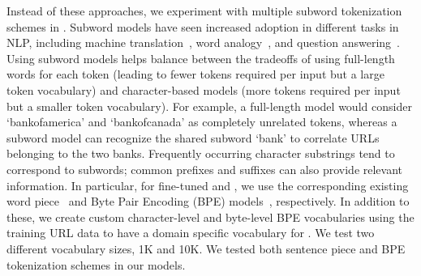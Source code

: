 Instead of these approaches, we experiment with multiple subword tokenization schemes in \URLTranSys.
Subword models have seen increased adoption in different tasks in NLP, including machine translation~\citep{sennrich2016neural}, word analogy~\citep{bojanowski2017enriching}, and question answering~\citep{zhang2019effective}.
Using subword models helps balance between the tradeoffs of using full-length words for each token (leading to fewer tokens required per input but a large token vocabulary) and character-based models (more tokens required per input but a smaller token vocabulary).
For example, a full-length model would consider `bankofamerica' and `bankofcanada' as completely unrelated tokens, whereas a subword model can recognize the shared subword `bank' to correlate URLs belonging to the two banks.
Frequently occurring character substrings tend to correspond to subwords; common prefixes and suffixes can also provide relevant information.
In particular, for fine-tuned \URLTranSysb and \URLTranSysr, we use the corresponding existing word piece~\citep{wu2016googles,devlin2019bert}  and Byte Pair Encoding (BPE) models~\citep{ratdford2019gpt2,liu2019roberta}, respectively.
In addition to these, we create custom character-level and byte-level BPE vocabularies using the training URL data to have a domain specific vocabulary for \URLTranSysc.
We test two different vocabulary sizes, 1K and 10K.
We tested  both sentence piece and BPE tokenization schemes in our models.


